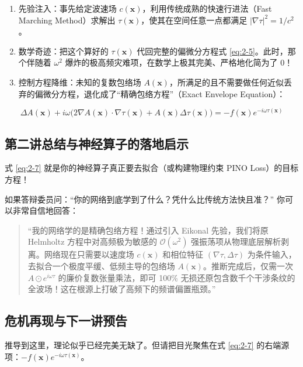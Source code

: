 \documentclass[12pt]{article}
\begin{document}
{\begin{enumerate}[leftmargin=2em]
    \item 先验注入：事先给定波速场 $c(\mathbf{x})$，利用传统成熟的快速行进法（Fast Marching Method）求解出 $\tau(\mathbf{x})$，使其在空间任意一点都满足 $|\nabla \tau|^2 = 1/c^2$。
    \item 数学奇迹：把这个算好的 $\tau(\mathbf{x})$ 代回完整的偏微分方程式 \eqref{eq:2-5}。此时，那个伴随着 $\omega^2$ 爆炸的极高频灾难项，在数学上极其完美、严格地化简为了 0！
    \item 控制方程降维：未知的复数包络场 $A(\mathbf{x})$，所满足的且不需要做任何近似丢弃的偏微分方程，退化成了“精确包络方程”（Exact Envelope Equation）：
\end{enumerate}

\begin{equation}
\Delta A(\mathbf{x}) + i \omega \big(2 \nabla A(\mathbf{x}) \cdot \nabla \tau(\mathbf{x}) + A(\mathbf{x}) \Delta \tau(\mathbf{x})\big) = -f(\mathbf{x})e^{-i\omega \tau(\mathbf{x})}
\label{eq:2-7}
\end{equation}

\subsection{第二讲总结与神经算子的落地启示}

式 \eqref{eq:2-7} 就是你的神经算子真正要去拟合（或构建物理约束 PINO Loss）的目标方程！

如果答辩委员问：“你的网络到底学到了什么？凭什么比传统方法快且准？”
你可以非常自信地回答：

\begin{quote}
“我的网络学的是精确包络方程！通过引入 Eikonal 先验，我们将原 Helmholtz 方程中对高频极为敏感的 $\mathcal{O}(\omega^2)$ 强振荡项从物理底层解析剥离。网络现在只需要以速度场 $c(\mathbf{x})$ 和相位特征 $(\nabla \tau, \Delta \tau)$ 为条件输入，去拟合一个极度平缓、低频主导的包络场 $A(\mathbf{x})$。推断完成后，仅需一次 $A \odot e^{i\omega \tau}$ 的廉价复数张量乘法，即可 100\% 无损还原包含数千个干涉条纹的全波场！这在根源上打破了高频下的频谱偏置瓶颈。”
\end{quote}

\subsection{危机再现与下一讲预告}

推导到这里，理论似乎已经完美无缺了。但请把目光聚焦在式 \eqref{eq:2-7} 的右端源项：$-f(\mathbf{x})e^{-i\omega \tau(\mathbf{x})}$。

}
\end{document}
